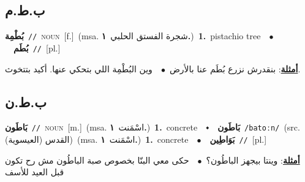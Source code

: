 \documentclass[10pt,a4paper,twoside]{article} %
\begin{document}
\begin{multicols}{2}
\vspace{-3mm}
\subsection*{\color{blue}\foreignlanguage{arabic}{ب.ط.م}\color{blue}{}} 

{\setlength\topsep{0pt}\textbf{\foreignlanguage{arabic}{بُطْمِة}}\ {\color{gray}\texttt{//}\color{black}}\ \textsc{noun}\ [f.]\ \color{gray}(msa. \foreignlanguage{arabic}{شجرة الفستق الحلبي}~\foreignlanguage{arabic}{\textbf{١.}})\color{black}\ \textbf{1.}~pistachio tree\ \ $\bullet$\ \ \setlength\topsep{0pt}\textbf{\foreignlanguage{arabic}{بُطَم}}\ {\color{gray}\texttt{//}\color{black}}\ [pl.]\  \begin{flushright}\color{gray}\foreignlanguage{arabic}{\textbf{\underline{\foreignlanguage{arabic}{أمثلة}}}: بنقدرش نزرع بُطَم عنا بالأرض\ $\bullet$\ \  وين البُطْمِة اللي بتحكي عنها. أكيد بتتخوث.}\end{flushright}\color{black}} \vspace{2mm}

\vspace{-3mm}
\subsection*{\color{blue}\foreignlanguage{arabic}{ب.ط.ن}\color{blue}{}} 

{\setlength\topsep{0pt}\textbf{\foreignlanguage{arabic}{بَاطَون}}\ {\color{gray}\texttt{//}\color{black}}\ \textsc{noun}\ [m.]\ \color{gray}(msa. \foreignlanguage{arabic}{اسْمَنت}~\foreignlanguage{arabic}{\textbf{١.}})\color{black}\ \textbf{1.}~concrete\ \ $\smblkdiamond$\ \ \setlength\topsep{0pt}\textbf{\foreignlanguage{arabic}{بَاطَون}}\ {\color{gray}\texttt{/batoːn/}\color{black}}\ (src. \color{gray}\foreignlanguage{arabic}{القدس (العيسوية)}\color{black})\ \color{gray}(msa. \foreignlanguage{arabic}{اسْمَنت}~\foreignlanguage{arabic}{\textbf{١.}})\color{black}\ \textbf{1.}~concrete\ \ $\bullet$\ \ \setlength\topsep{0pt}\textbf{\foreignlanguage{arabic}{بَوَاطِين}}\ {\color{gray}\texttt{//}\color{black}}\ [pl.]\  \begin{flushright}\color{gray}\foreignlanguage{arabic}{\textbf{\underline{\foreignlanguage{arabic}{أمثلة}}}: وينتا بيجهز الباطُون؟\ $\bullet$\ \  حكى معي البنّا بخصوص صبة الباطُون مش رح تكون قبل العيد للأسف}\end{flushright}\color{black}} \vspace{2mm}


\end{multicols}
\end{document}
